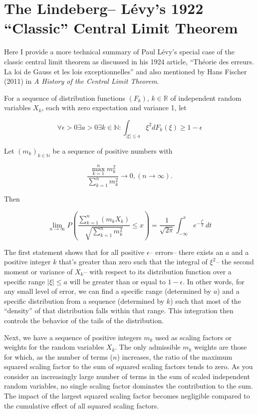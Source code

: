 \documentclass[11.5pt,article,oneside]{article}
\begin{document}
\bigskip 

\section*{The Lindeberg– Lévy's 1922 “Classic” Central Limit \newline Theorem}

\setlength{\parindent}{10 pt}
Here I provide a more technical summary of Paul Lévy's special case of the classic central limit theorem as discussed in his 1924 article, “Théorie des erreurs. La loi de Gauss et les lois exceptionnelles” and also mentioned by Hans Fischer (2011) in \textit{A History of the Central Limit Theorem}.

\bigskip

\small For a sequence of distribution functions $(F_{k})$, $k \in \mathbb{R}$ of independent random variables $X_{k}$, each with zero expectation  and variance 1, let 

\[\forall{\epsilon} > {0}\exists{a} > {0}\exists{k} \in {\mathbb{N}: \int_{|\xi| \leq {a}}} \xi^{2}{dF_k(\xi) \geq 1 - \epsilon}
\]

Let $(m_{k})_{k \in \mathbb{N}}$ be a sequence of positive numbers with
\medskip

\[\frac{\max_{k=1}^{n} m_{k}^{2}}{\sum_{k=1}^{n} m_{k}^{2}} \rightarrow {0},  
({n} \rightarrow \infty).
\]

Then 

\[\lim_{{n \to \infty}} P\left(\frac{\sum_{k=1}^{n} (m_k X_k)}{\sqrt{\sum_{k=1}^{n} m_k^{2}}} \leq x\right) = \frac{1}{\sqrt{2\pi}} \int_{-\infty}^{x}  e^{-\frac{t^2}{2}} \, dt
\]

\medskip

\normalsize The first statement shows that for all positive $\epsilon$– errors–  there exists an ${a}$ and a positive integer ${k}$ that's greater than zero such that the integral of $\xi^{2}$– the second moment or variance of $X_{k}$– with respect to its distribution function over a specific range $|\xi| \leq {a}$ will be greater than or equal to $1 -\epsilon$. In other words, for any small level of error, we can find a specific range (determined by ${a}$) and a specific distribution from a sequence (determined by ${k}$) such that most of the “density” of that distribution falls within that range. This integration then controls the behavior of the tails of the distribution. \vspace{.3em}
\newpage

Next, we have a sequence of positive integers $m_{k}$ used as scaling factors or weights for the random variables $X_{k}$. The only admissible $m_{k}$ weights are those for which, as the number of terms ($n$) increases, the ratio of the maximum squared scaling factor to the sum of squared scaling factors tends to zero. As you consider an increasingly large number of terms in the sum of scaled independent random variables, no single scaling factor dominates the contribution to the sum. The impact of the largest squared scaling factor becomes negligible compared to the cumulative effect of all squared scaling factors. \vspace{.3em}
\end{document}
